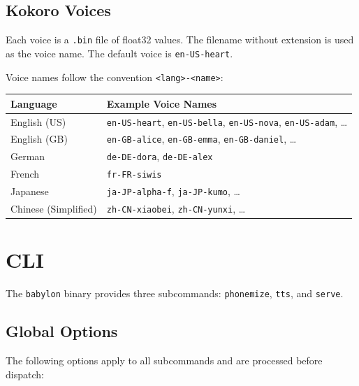 \documentclass[12pt,a4paper]{article}
\begin{document}
\subsection{Kokoro Voices}

Each voice is a \texttt{.bin} file of float32 values. The filename without extension is used as the voice name. The default voice is \texttt{en-US-heart}.

Voice names follow the convention \texttt{<lang>-<name>}:

\begin{center}
\begin{tabular}{ll}
\toprule
\textbf{Language} & \textbf{Example Voice Names} \\
\midrule
English (US) & \texttt{en-US-heart}, \texttt{en-US-bella}, \texttt{en-US-nova}, \texttt{en-US-adam}, \ldots \\
English (GB) & \texttt{en-GB-alice}, \texttt{en-GB-emma}, \texttt{en-GB-daniel}, \ldots \\
German       & \texttt{de-DE-dora}, \texttt{de-DE-alex} \\
French       & \texttt{fr-FR-siwis} \\
Japanese     & \texttt{ja-JP-alpha-f}, \texttt{ja-JP-kumo}, \ldots \\
Chinese (Simplified) & \texttt{zh-CN-xiaobei}, \texttt{zh-CN-yunxi}, \ldots \\
\bottomrule
\end{tabular}
\end{center}

\section{CLI}
\label{sec:cli}

The \texttt{babylon} binary provides three subcommands: \texttt{phonemize}, \texttt{tts}, and \texttt{serve}.

\subsection{Global Options}

The following options apply to all subcommands and are processed before dispatch:
\end{document}
